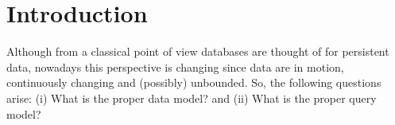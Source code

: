 
\section{Introduction}
\iffalse
TODO:
\begin{itemize}
    \item Explicar el problema. Soluciones propuestas hasta ahora. Por qué no son suficientes. En qué consiste la nuestra.
    \item Definición general aplicación propuesta. Validez para PoS card fraud or internet frauds (CNP: Card Not Present frauds)... pero que hemos concretado en el caso de los ATM fraud.
    \fmc{Poner aquí contexto sobre los distintos tipos de fraude y sus estadísticas: referencia al informe SEPA ("Seventh report on card fraud typos")}
    \item Explicar cómo está organizado el documento.
\end{itemize}
\fi

Although from a classical point of view  databases are thought of for persistent data, nowadays this perspective is changing since data are in motion, continuously changing and (possibly) unbounded. So, the following questions arise: (i) What is the proper data model? and (ii) What is the proper query model? 

